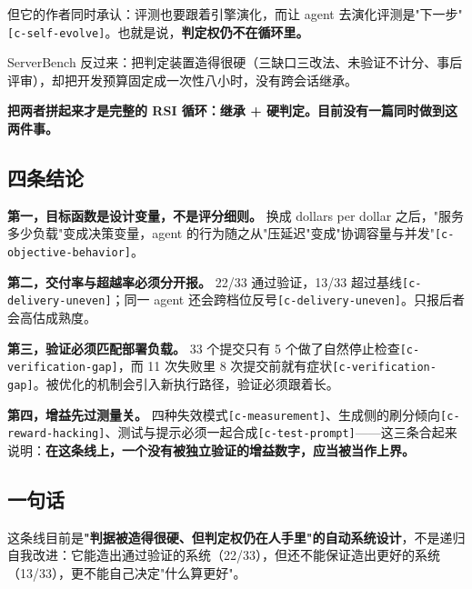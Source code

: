 但它的作者同时承认：评测也要跟着引擎演化，而让 agent 去演化评测是"下一步"{\scriptsize\texttt{[c-\hspace{0pt}self-\hspace{0pt}evolve]}}。也就是说，\textbf{判定权仍不在循环里。}


ServerBench 反过来：把判定装置造得很硬（三缺口三改法、未验证不计分、事后评审），却把开发预算固定成一次性八小时，没有跨会话继承。


\textbf{把两者拼起来才是完整的 RSI 循环：继承 + 硬判定。目前没有一篇同时做到这两件事。}


\subsection{四条结论}

\textbf{第一，目标函数是设计变量，不是评分细则。} 换成 dollars per dollar 之后，"服务多少负载"变成决策变量，agent 的行为随之从"压延迟"变成"协调容量与并发"{\scriptsize\texttt{[c-\hspace{0pt}objective-\hspace{0pt}behavior]}}。


\textbf{第二，交付率与超越率必须分开报。} 22/33 通过验证，13/33 超过基线{\scriptsize\texttt{[c-\hspace{0pt}delivery-\hspace{0pt}uneven]}}；同一 agent 还会跨档位反号{\scriptsize\texttt{[c-\hspace{0pt}delivery-\hspace{0pt}uneven]}}。只报后者会高估成熟度。


\textbf{第三，验证必须匹配部署负载。} 33 个提交只有 5 个做了自然停止检查{\scriptsize\texttt{[c-\hspace{0pt}verification-\hspace{0pt}gap]}}，而 11 次失败里 8 次提交前就有症状{\scriptsize\texttt{[c-\hspace{0pt}verification-\hspace{0pt}gap]}}。被优化的机制会引入新执行路径，验证必须跟着长。


\textbf{第四，增益先过测量关。} 四种失效模式{\scriptsize\texttt{[c-\hspace{0pt}measurement]}}、生成侧的刷分倾向{\scriptsize\texttt{[c-\hspace{0pt}reward-\hspace{0pt}hacking]}}、测试与提示必须一起合成{\scriptsize\texttt{[c-\hspace{0pt}test-\hspace{0pt}prompt]}}——这三条合起来说明：\textbf{在这条线上，一个没有被独立验证的增益数字，应当被当作上界。}


\subsection{一句话}

这条线目前是\textbf{"判据被造得很硬、但判定权仍在人手里"的自动系统设计}，不是递归自我改进：它能造出通过验证的系统（22/33），但还不能保证造出更好的系统（13/33），更不能自己决定"什么算更好"。

